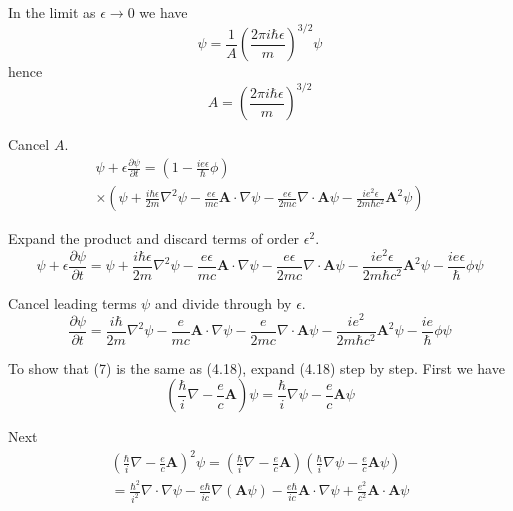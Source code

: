 \documentclass[12pt]{article}
\begin{document}
In the limit as $\epsilon\rightarrow0$ we have
\begin{equation*}
\psi=\frac{1}{A}\left(\frac{2\pi i\hbar\epsilon}{m}\right)^{3/2}\psi
\end{equation*}
hence
\begin{equation*}
A=\left(\frac{2\pi i\hbar\epsilon}{m}\right)^{3/2}
\end{equation*}

Cancel $A$.
\begin{multline*}
\psi+\epsilon\frac{\partial\psi}{\partial t}
=\left(1-\frac{ie\epsilon}{\hbar}\phi\right)
\\
\times\left(
\psi
+\frac{i\hbar\epsilon}{2m}\nabla^2\psi
-\frac{e\epsilon}{mc}\mathbf A\cdot\nabla\psi
-\frac{e\epsilon}{2mc}\nabla\cdot\mathbf A\psi
-\frac{ie^2\epsilon}{2m\hbar c^2}\mathbf A^2\psi
\right)
\end{multline*}

Expand the product and discard terms of order $\epsilon^2$.
\begin{equation*}
\psi+\epsilon\frac{\partial\psi}{\partial t}
=\psi
+\frac{i\hbar\epsilon}{2m}\nabla^2\psi
-\frac{e\epsilon}{mc}\mathbf A\cdot\nabla\psi
-\frac{e\epsilon}{2mc}\nabla\cdot\mathbf A\psi
-\frac{ie^2\epsilon}{2m\hbar c^2}\mathbf A^2\psi
-\frac{ie\epsilon}{\hbar}\phi\psi
\end{equation*}

Cancel leading terms $\psi$ and divide through by $\epsilon$.
\begin{equation*}
\frac{\partial\psi}{\partial t}
=\frac{i\hbar}{2m}\nabla^2\psi
-\frac{e}{mc}\mathbf A\cdot\nabla\psi
-\frac{e}{2mc}\nabla\cdot\mathbf A\psi
-\frac{ie^2}{2m\hbar c^2}\mathbf A^2\psi
-\frac{ie}{\hbar}\phi\psi
\tag{7}
\end{equation*}

To show that (7) is the same as (4.18), expand (4.18) step by step.
First we have
\begin{equation*}
\left(\frac{\hbar}{i}\nabla-\frac{e}{c}\mathbf A\right)\psi
=\frac{\hbar}{i}\nabla\psi-\frac{e}{c}\mathbf A\psi
\end{equation*}

Next
\begin{multline*}
\left(\frac{\hbar}{i}\nabla-\frac{e}{c}\mathbf A\right)^2\psi
=\left(\frac{\hbar}{i}\nabla-\frac{e}{c}\mathbf A\right)
\left(\frac{\hbar}{i}\nabla\psi-\frac{e}{c}\mathbf A\psi\right)
\\
=\frac{\hbar^2}{i^2}\nabla\cdot\nabla\psi
-\frac{e\hbar}{ic}\nabla(\mathbf A\psi)
-\frac{e\hbar}{ic}\mathbf A\cdot\nabla\psi
+\frac{e^2}{c^2}\mathbf A\cdot\mathbf A\psi
\end{multline*}
\end{document}

